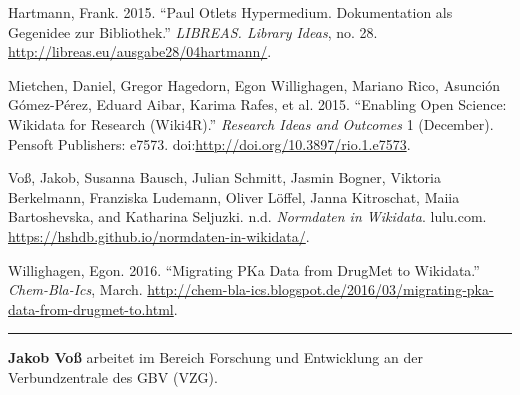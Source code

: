 \documentclass[a4paper,
fontsize=11pt,
oneside,
numbers=noperiodatend,
parskip=half-,
bibliography=totoc,
final
]{scrartcl}
\begin{document}
Hartmann, Frank. 2015. ``Paul Otlets Hypermedium. Dokumentation als
Gegenidee zur Bibliothek.'' \emph{LIBREAS. Library Ideas}, no. 28.
\url{http://libreas.eu/ausgabe28/04hartmann/}.

Mietchen, Daniel, Gregor Hagedorn, Egon Willighagen, Mariano Rico,
Asunción Gómez-Pérez, Eduard Aibar, Karima Rafes, et al. 2015.
``Enabling Open Science: Wikidata for Research (Wiki4R).''
\emph{Research Ideas and Outcomes} 1 (December). Pensoft Publishers:
e7573. doi:\url{http://doi.org/10.3897/rio.1.e7573}.

Voß, Jakob, Susanna Bausch, Julian Schmitt, Jasmin Bogner, Viktoria
Berkelmann, Franziska Ludemann, Oliver Löffel, Janna Kitroschat, Maiia
Bartoshevska, and Katharina Seljuzki. n.d. \emph{Normdaten in Wikidata}.
lulu.com. \url{https://hshdb.github.io/normdaten-in-wikidata/}.

Willighagen, Egon. 2016. ``Migrating PKa Data from DrugMet to
Wikidata.'' \emph{Chem-Bla-Ics}, March.
\url{http://chem-bla-ics.blogspot.de/2016/03/migrating-pka-data-from-drugmet-to.html}.

\begin{center}\rule{0.5\linewidth}{\linethickness}\end{center}

\textbf{Jakob Voß} arbeitet im Bereich Forschung und Entwicklung an der
Verbundzentrale des GBV (VZG).
\end{document}
